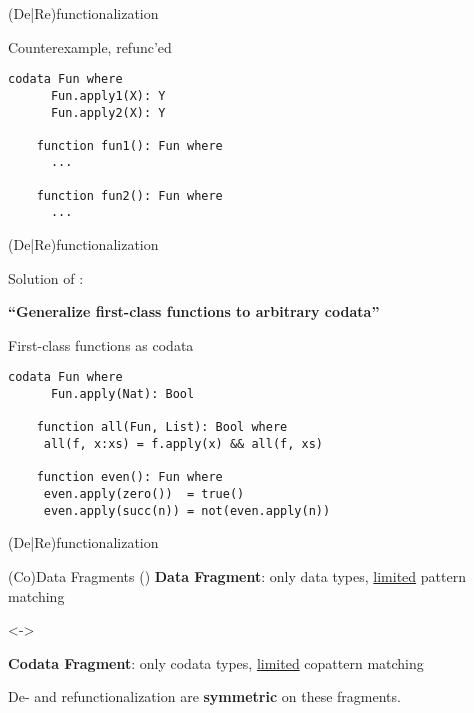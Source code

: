 \documentclass[xcolor=svgnames]{beamer}
\begin{document}
\begin{frame}[fragile]
  {(De|Re)functionalization}
  \begin{block}{Counterexample, refunc'ed}
    \begin{lstlisting}[escapechar=!]
    codata Fun where
      Fun.apply1(X): Y
      Fun.apply2(X): Y

    function fun1(): Fun where
      ...
    
    function fun2(): Fun where
      ...
    \end{lstlisting}
  \end{block}
\end{frame}

\begin{frame}[fragile]
  {(De|Re)functionalization}

Solution of \citet{rendel15automatic}: 

\textbf{``Generalize first-class functions to arbitrary codata''}

\begin{block}{First-class functions as codata}
    \begin{lstlisting}[escapechar=!]
    codata Fun where
      Fun.apply(Nat): Bool

    function all(Fun, List): Bool where
     all(f, x:xs) = f.apply(x) && all(f, xs)

    function even(): Fun where
     even.apply(zero())  = true()
     even.apply(succ(n)) = not(even.apply(n))
    \end{lstlisting}
  \end{block}

\end{frame}

\begin{frame}
  {(De|Re)functionalization}

\begin{block}{(Co)Data Fragments (\citeauthor{rendel15automatic})}
  \textbf{Data Fragment}: only data types, \underline{limited} pattern matching

  <->

  \textbf{Codata Fragment}: only codata types, \underline{limited} copattern matching
\end{block}

De- and refunctionalization are \textbf{symmetric} on these fragments.

\end{frame}
\end{document}
